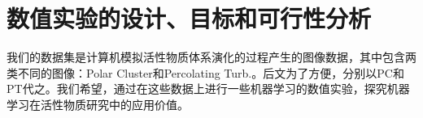 \section{数值实验的设计、目标和可行性分析}
我们的数据集是计算机模拟活性物质体系演化的过程产生的图像数据\cite{shi20180702}，其中包含两类不同的图像：Polar Cluster和Percolating Turb.。后文为了方便，分别以PC和PT代之。我们希望，通过在这些数据上进行一些机器学习的数值实验，探究机器学习在活性物质研究中的应用价值。
\begin{figure}[H]
	\centering
\end{figure}
